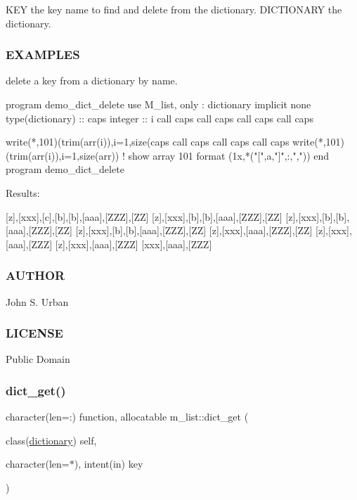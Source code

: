 \begin{DoxyVerb}KEY           the key name to find and delete from the dictionary.
DICTIONARY    the dictionary.
\end{DoxyVerb}


\subsubsection*{E\+X\+A\+M\+P\+L\+ES}

\begin{DoxyVerb}delete a key from a dictionary by name.

 program demo_dict_delete
 use M_list, only : dictionary
 implicit none
 type(dictionary) :: caps
 integer                       :: i
 call caps%
 call caps%
 call caps%
 call caps%

 write(*,101)(trim(arr(i)),i=1,size(caps%
 call  caps%
 call  caps%
 call  caps%
 write(*,101)(trim(arr(i)),i=1,size(arr)) ! show array
 101 format (1x,*("[",a,"]",:,","))
 end program demo_dict_delete

Results:

 [z],[xxx],[c],[b],[b],[aaa],[ZZZ],[ZZ]
 [z],[xxx],[b],[b],[aaa],[ZZZ],[ZZ]
 [z],[xxx],[b],[b],[aaa],[ZZZ],[ZZ]
 [z],[xxx],[b],[b],[aaa],[ZZZ],[ZZ]
 [z],[xxx],[aaa],[ZZZ],[ZZ]
 [z],[xxx],[aaa],[ZZZ]
 [z],[xxx],[aaa],[ZZZ]
 [xxx],[aaa],[ZZZ]
\end{DoxyVerb}


\subsubsection*{A\+U\+T\+H\+OR}

John S. Urban \subsubsection*{L\+I\+C\+E\+N\+SE}

Public Domain \mbox{\label{namespacem__list_a7b9bb0b8fa4b0eeef45d7fcdc21f8bf3}} 
\subsubsection{\texorpdfstring{dict\+\_\+get()}{dict\_get()}}
{\footnotesize\ttfamily character(len=\+:) function, allocatable m\+\_\+list\+::dict\+\_\+get (\begin{DoxyParamCaption}\item[{class(\mbox{\hyperlink{structm__list_1_1dictionary}{dictionary}})}]{self,  }\item[{character(len=$\ast$), intent(in)}]{key }\end{DoxyParamCaption})\hspace{0.3cm}{\ttfamily [private]}}




